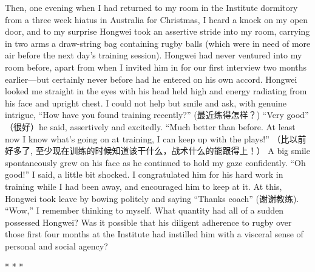 \begin{CJK}{UTF8}{gbsn}
Then, one evening when I had returned to my room in the Institute dormitory from a three week hiatus in Australia for Christmas, I heard a knock on my open door, and to my surprise Hongwei took an assertive stride into my room, carrying in two arms a draw-string bag containing rugby balls (which were in need of more air before the next day's training session).  Hongwei had never ventured into my room before, apart from when I invited him in for our first interview two months earlier---but certainly never before had he entered on his own accord.  Hongwei looked me straight in the eyes with his head held high and energy radiating from his face and upright chest.  I could not help but smile and ask, with genuine intrigue, ``How have you found training recently?'' (最近练得怎样？)
``Very good'' （很好）he said, assertively and excitedly.  ``Much better than before.  At least now I know what’s going on at training, I can keep up with the plays!'' （比以前好多了, 至少现在训练的时候知道该干什么，战术什么的能跟得上！） A big smile spontaneously grew on his face as he continued to hold my gaze confidently.  ``Oh good!'' I said, a little bit shocked.  I congratulated him for his hard work in training while I had been away, and encouraged him to keep at it.  At this, Hongwei took leave by bowing politely and saying ``Thanks coach'' (谢谢教练).  ``Wow,'' I remember thinking to myself.  What quantity had all of a sudden possessed Hongwei? Was it possible that his diligent adherence to rugby over those first four months at the Institute had instilled him with a visceral sense of personal and social agency?

                          \begin{center}
                            * * *
                          \end{center}

















\end{CJK}
